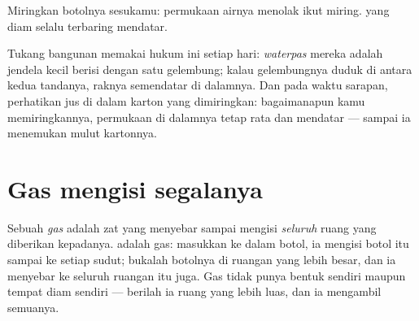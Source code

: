 \begin{omfigure}

{\small Miringkan botolnya sesukamu: permukaan airnya menolak ikut
miring.  yang diam selalu terbaring mendatar.}
\end{omfigure}

\begin{example}\label{ex:g3:solids-liquids-gases:level}
Tukang bangunan memakai hukum ini setiap hari: \emph{waterpas} mereka
adalah jendela kecil berisi  dengan satu gelembung; kalau
gelembungnya duduk di antara kedua tandanya, raknya semendatar  di dalamnya. Dan pada waktu sarapan, perhatikan jus di dalam
karton yang dimiringkan: bagaimanapun kamu memiringkannya, permukaan
di dalamnya tetap rata dan mendatar --- sampai ia menemukan mulut
kartonnya.
\end{example}

\section{Gas mengisi segalanya}

\begin{definition}[Gas]\label{def:g3:solids-liquids-gases:gas}
Sebuah \emph{gas} adalah zat yang menyebar sampai mengisi
\emph{seluruh} ruang yang diberikan kepadanya.  adalah gas: masukkan ke
dalam botol, ia mengisi botol itu sampai ke setiap sudut; bukalah
botolnya di ruangan yang lebih besar, dan ia menyebar ke seluruh
ruangan itu juga. Gas tidak punya bentuk sendiri maupun tempat diam
sendiri --- berilah ia ruang yang lebih luas, dan ia mengambil
semuanya.
\end{definition}

